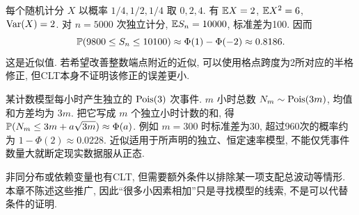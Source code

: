 \begin{example}
每个随机计分 $X$ 以概率 $1/4,1/2,1/4$ 取 $0,2,4$. 有 $\mathbb E X=2$, $\mathbb E X^2=6$, $\operatorname{Var}(X)=2$. 对 $n=5000$ 次独立计分, $\mathbb E S_n=10000$, 标准差为100. 因而
\[\mathbb P(9800\leq S_n\leq10100)\approx\Phi(1)-\Phi(-2)\approx0.8186.\]
这是近似值. 若希望改善整数端点附近的近似, 可以使用格点跨度为2所对应的半格修正, 但CLT本身不证明该修正的误差更小.
\end{example}
\begin{example}
某计数模型每小时产生独立的 $\operatorname{Pois}(3)$ 次事件. $m$ 小时总数 $N_m\sim\operatorname{Pois}(3m)$, 均值和方差均为 $3m$. 把它写成 $m$ 个独立小时计数的和, 得
$\mathbb P(N_m\leq3m+a\sqrt{3m})\approx\Phi(a)$. 例如 $m=300$ 时标准差为30, 超过960次的概率约为 $1-\Phi(2)\approx0.0228$. 近似适用于所声明的独立、恒定速率模型, 不能仅凭事件数量大就断定现实数据服从正态.
\end{example}
非同分布或依赖变量也有CLT, 但需要额外条件以排除某一项支配总波动等情形. 本章不陈述这些推广, 因此“很多小因素相加”只是寻找模型的线索, 不是可以代替条件的证明.

